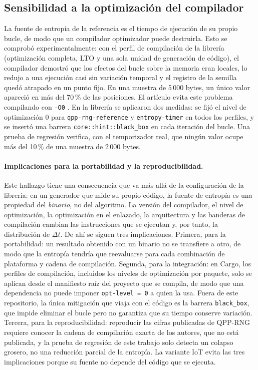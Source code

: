 \subsection{Sensibilidad a la optimización del compilador}

La fuente de entropía de la referencia es el tiempo de ejecución de su propio bucle, de modo que un compilador optimizador puede destruirla. Esto se comprobó experimentalmente: con el perfil de compilación de la librería (optimización completa, LTO y una sola unidad de generación de código), el compilador demostró que los efectos del bucle sobre la memoria eran locales, lo redujo a una ejecución casi sin variación temporal y el registro de la semilla quedó atrapado en un punto fijo. En una muestra de 5\,000 bytes, un único valor apareció en más del 70\,\% de las posiciones. El artículo evita este problema compilando con \texttt{-O0} \cite{Vrana2025RawEvaluation}. En la librería se aplicaron dos medidas: se fijó el nivel de optimización 0 para \texttt{qpp-rng-reference} y \texttt{entropy-timer} en todos los perfiles, y se insertó una barrera \texttt{core::hint::black\_box} en cada iteración del bucle. Una prueba de regresión verifica, con el temporizador real, que ningún valor ocupe más del 10\,\% de una muestra de 2\,000 bytes.

\paragraph{Implicaciones para la portabilidad y la reproducibilidad.} Este hallazgo tiene una consecuencia que va más allá de la configuración de la librería: en un generador que mide su propio código, la fuente de entropía es una propiedad del \emph{binario}, no del algoritmo. La versión del compilador, el nivel de optimización, la optimización en el enlazado, la arquitectura y las banderas de compilación cambian las instrucciones que se ejecutan y, por tanto, la distribución de $\Delta t$. De ahí se siguen tres implicaciones. Primera, para la portabilidad: un resultado obtenido con un binario no se transfiere a otro, de modo que la entropía tendría que reevaluarse para cada combinación de plataforma y cadena de compilación. Segunda, para la integración: en Cargo, los perfiles de compilación, incluidos los niveles de optimización por paquete, solo se aplican desde el manifiesto raíz del proyecto que se compila, de modo que una dependencia no puede imponer \texttt{opt-level = 0} a quien la usa. Fuera de este repositorio, la única mitigación que viaja con el código es la barrera \texttt{black\_box}, que impide eliminar el bucle pero no garantiza que su tiempo conserve variación. Tercera, para la reproducibilidad: reproducir las cifras publicadas de QPP-RNG requiere conocer la cadena de compilación exacta de los autores, que no está publicada, y la prueba de regresión de este trabajo solo detecta un colapso grosero, no una reducción parcial de la entropía. La variante IoT evita las tres implicaciones porque su fuente no depende del código que se ejecuta.

